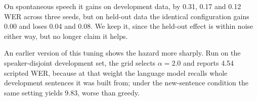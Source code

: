 On spontaneous speech it gains on development data, by 0.31, 0.17 and 0.12 WER
across three seeds, but on held-out data the identical configuration gains 0.00
and loses 0.04 and 0.08. We keep it, since the held-out effect is within noise
either way, but no longer claim it helps.

An earlier version of this tuning shows the hazard more sharply. Run on the
speaker-disjoint development set, the grid selects $\alpha = 2.0$ and reports
4.54 scripted WER, because at that weight the language model recalls whole
development sentences it was built from; under the new-sentence condition the
same setting yields 9.83, worse than greedy.

